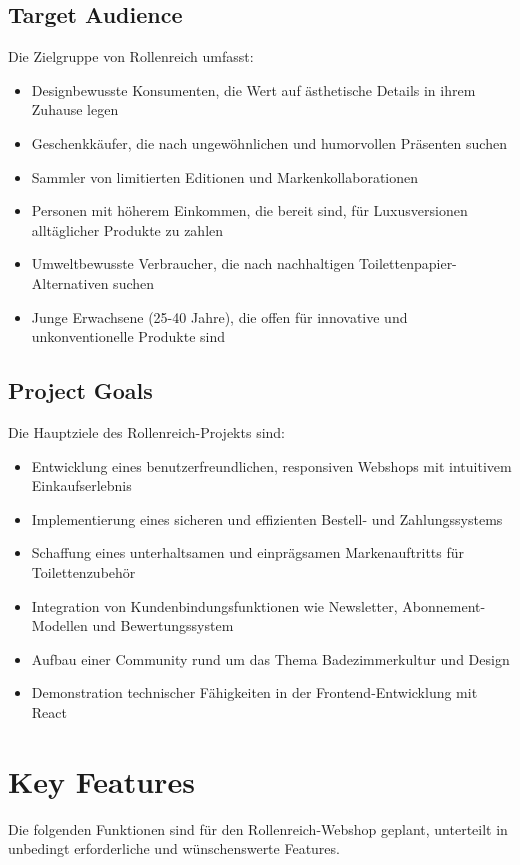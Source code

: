 \documentclass[a4paper,11pt]{article}
\begin{document}
\subsection{Target Audience}
Die Zielgruppe von Rollenreich umfasst:
\begin{itemize}
    \item Designbewusste Konsumenten, die Wert auf ästhetische Details in ihrem Zuhause legen
    \item Geschenkkäufer, die nach ungewöhnlichen und humorvollen Präsenten suchen
    \item Sammler von limitierten Editionen und Markenkollaborationen
    \item Personen mit höherem Einkommen, die bereit sind, für Luxusversionen alltäglicher Produkte zu zahlen
    \item Umweltbewusste Verbraucher, die nach nachhaltigen Toilettenpapier-Alternativen suchen
    \item Junge Erwachsene (25-40 Jahre), die offen für innovative und unkonventionelle Produkte sind
\end{itemize}

\subsection{Project Goals}
Die Hauptziele des Rollenreich-Projekts sind:
\begin{itemize}
    \item Entwicklung eines benutzerfreundlichen, responsiven Webshops mit intuitivem Einkaufserlebnis
    \item Implementierung eines sicheren und effizienten Bestell- und Zahlungssystems
    \item Schaffung eines unterhaltsamen und einprägsamen Markenauftritts für Toilettenzubehör
    \item Integration von Kundenbindungsfunktionen wie Newsletter, Abonnement-Modellen und Bewertungssystem
    \item Aufbau einer Community rund um das Thema Badezimmerkultur und Design
    \item Demonstration technischer Fähigkeiten in der Frontend-Entwicklung mit React
\end{itemize}

\section{Key Features}
Die folgenden Funktionen sind für den Rollenreich-Webshop geplant, unterteilt in unbedingt erforderliche und wünschenswerte Features.
\end{document}
